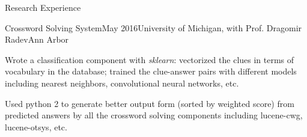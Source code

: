 \documentclass{resume} %
\begin{document}
\begin{rSection}{Research Experience}
	\begin{rSubsection}{Crossword Solving System}{May 2016}{University of Michigan, with Prof. Dragomir Radev}{Ann Arbor}
	\item Wrote a classification component with \textit{sklearn}: vectorized the clues in terms of vocabulary in the database; trained the clue-answer pairs with different models including nearest neighbors, convolutional neural networks, etc.
	\item Used python 2 to generate better output form (sorted by weighted score) from predicted answers by all the crossword solving components including lucene-cwg, lucene-otsys, etc.
	\end{rSubsection}
\end{rSection}
%
%	
%	
%	
%	
%	
%		
\end{document}
